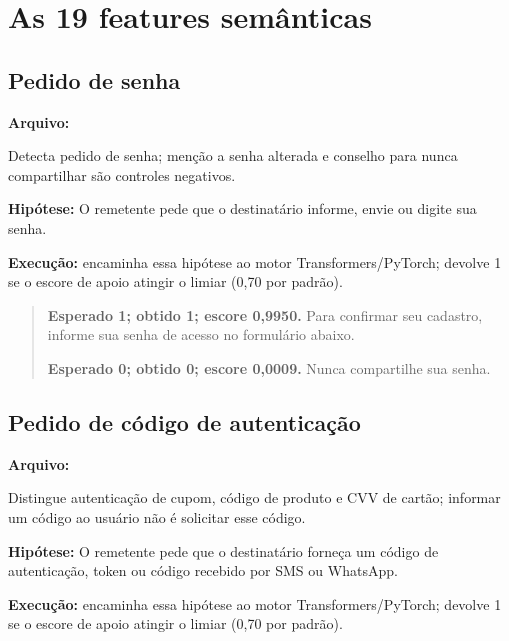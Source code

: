 \section{As 19 features semânticas}

\subsection{Pedido de senha}

\textbf{Arquivo:} \par

Detecta pedido de senha; menção a senha alterada e conselho para nunca compartilhar são controles negativos.

\textbf{Hipótese:} O remetente pede que o destinatário informe, envie ou digite sua senha.

\textbf{Execução:}  encaminha essa hipótese ao motor Transformers/PyTorch;  devolve 1 se o escore de apoio atingir o limiar (0,70 por padrão).

\begin{quote}\small

\textbf{Esperado 1; obtido 1; escore 0,9950.} Para confirmar seu cadastro, informe sua senha de acesso no formulário abaixo.\par

\textbf{Esperado 0; obtido 0; escore 0,0009.} Nunca compartilhe sua senha.\par

\end{quote}

\subsection{Pedido de código de autenticação}

\textbf{Arquivo:} \par

Distingue autenticação de cupom, código de produto e CVV de cartão; informar um código ao usuário não é solicitar esse código.

\textbf{Hipótese:} O remetente pede que o destinatário forneça um código de autenticação, token ou código recebido por SMS ou WhatsApp.

\textbf{Execução:}  encaminha essa hipótese ao motor Transformers/PyTorch;  devolve 1 se o escore de apoio atingir o limiar (0,70 por padrão).

